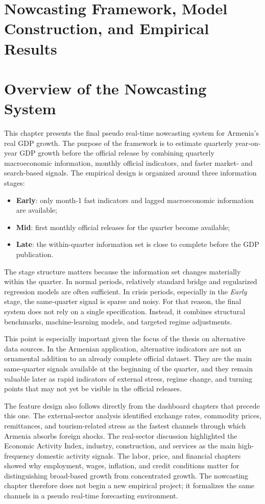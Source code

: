 \documentclass[12pt,a4paper]{article}
\begin{document}
\section{Nowcasting Framework, Model Construction, and Empirical Results}

\section{Overview of the Nowcasting System}

This chapter presents the final pseudo real-time nowcasting system for Armenia's real GDP growth. The purpose of the framework is to estimate quarterly year-on-year GDP growth before the official release by combining quarterly macroeconomic information, monthly official indicators, and faster market- and search-based signals. The empirical design is organized around three information stages:
\begin{itemize}
    \item \textbf{Early}: only month-1 fast indicators and lagged macroeconomic information are available;
    \item \textbf{Mid}: first monthly official releases for the quarter become available;
    \item \textbf{Late}: the within-quarter information set is close to complete before the GDP publication.
\end{itemize}

The stage structure matters because the information set changes materially within the quarter. In normal periods, relatively standard bridge and regularized regression models are often sufficient. In crisis periods, especially in the \textit{Early} stage, the same-quarter signal is sparse and noisy. For that reason, the final system does not rely on a single specification. Instead, it combines structural benchmarks, machine-learning models, and targeted regime adjustments.

This point is especially important given the focus of the thesis on alternative data sources. In the Armenian application, alternative indicators are not an ornamental addition to an already complete official dataset. They are the main same-quarter signals available at the beginning of the quarter, and they remain valuable later as rapid indicators of external stress, regime change, and turning points that may not yet be visible in the official releases.

The feature design also follows directly from the dashboard chapters that precede this one. The external-sector analysis identified exchange rates, commodity prices, remittances, and tourism-related stress as the fastest channels through which Armenia absorbs foreign shocks. The real-sector discussion highlighted the Economic Activity Index, industry, construction, and services as the main high-frequency domestic activity signals. The labor, price, and financial chapters showed why employment, wages, inflation, and credit conditions matter for distinguishing broad-based growth from concentrated growth. The nowcasting chapter therefore does not begin a new empirical project; it formalizes the same channels in a pseudo real-time forecasting environment.
\end{document}
